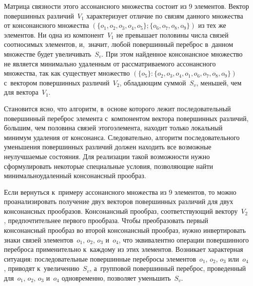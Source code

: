 \begin{multicols}{2}


     
     Матрица связности этого ассонансного множества со\-сто\-ит из 9 
элементов. Вектор повершинных различий~$V_1$ характеризует отличие по 
связям данного множества от консонансного множества $(\{o_1, o_2, o_3, o_4, 
o_5\}; \{o_6, o_7, o_8, o_9\})$ из тех же элементов. Ни одна из 
компонент~$V_1$ не превышает половины чис\-ла связей соотносимых 
элементов, и,~значит, любой повершинный переброс в~данном множестве 
будет увеличивать~$S_v$. При этом найденное консонансное множество не 
является минимально удаленным от рас\-смат\-ри\-ва\-емо\-го ассонансного 
множества, так как существует множество $(\{o_5\}: \{o_2, o_3, o_4, o_1, o_6, 
o_7, o_8, o_9\})$ с~вектором повершинных различий~$V_2$, обла\-да\-ющим 
суммой~$S_v$, меньшей, чем для вектора~$V_1$. 
     
     Становится ясно, что алгоритм, в~основе которого лежит 
по\-сле\-до\-ва\-тель\-ный повершинный переброс элемента с~компонентом вектора 
повершинных различий, б$\acute{\mbox{о}}$льшим, чем половина связей 
\mbox{этого}\linebreak элемента, находит только локальный минимум удаления от консонанса. 
Следовательно, алгоритм последовательного уменьшения повершинных\linebreak 
\mbox{различий} должен находить все возможные неулучшаемые состояния. Для 
реализации такой воз\-мож\-ности нужно сформулировать некоторые 
специальные условия, поз\-во\-ля\-ющие найти минимально\linebreak удаленный 
консонансный прообраз.
     
     Если вернуться к~примеру ассонансного множества из 9 
элементов, то мож\-но проанализировать получение двух векторов 
повершинных различий для двух консонансных прообразов. Консонансный 
прообраз, со\-от\-вет\-ст\-ву\-ющий вектору~$V_2$, предпочтительнее первого 
прообраза. Чтобы преобразовать пер\-вый консонансный прообраз во второй 
консонансный прообраз, нуж\-но инвертировать знаки связей элементов~$o_1$, 
$o_2$, $o_3$ и~$o_4$, что эквивалентно операции повершинного переброса 
применительно к~каж\-до\-му из этих элементов. Возникает характерная 
ситуация: последовательные повершинные перебросы элементов~$o_1$, 
$o_2$, $o_3$ или~$o_4$, приводят к~увеличению~$S_v$, а~груп\-по\-вой 
повершинный переброс, проведенный для~$o_1$, $o_2$, $o_3$ и~$o_4$ 
одновременно, поз\-во\-ля\-ет уменьшить~$S_v$. 
     

\end{multicols}

